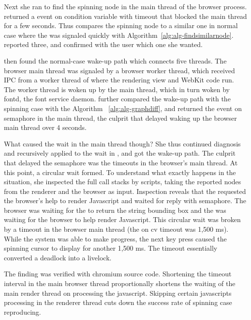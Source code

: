Next she ran \xxx to find the spinning node in the main thread of the browser
process. \xxx returned a  event on condition variable with timeout that
blocked the main thread for a few seconds. Thus \xxx compares the spinning node
to a similar one in normal case where the  was signaled quickly with
Algorithm~\ref{alg:alg-findsimilarnode}. \xxx reported three, and confirmed with
the user which one she wanted.

\xxx then found the normal-case wake-up path which connects five threads. The
browser main thread was signaled by a browser worker thread, which received IPC
from a worker thread of  where the rendering view and WebKit code
run. The worker thread is woken up by the  main thread, which in
turn woken by fontd, the font service daemon. \xxx further compared the wake-up
path with the spinning case with the Algorithm ~\ref{alg:alg-graphdiff}, and
returned the  event on semaphore in the  main thread, the
culprit that delayed waking up the browser main thread over 4 seconds.

What caused the wait in the  main thread though? She thus continued
diagnosis and recursively applied \xxx to the wait in , and got
the wake-up path. The culprit that delayed the semaphore was the timeouts in
the browser's main thread. At this point, a circular wait formed. To understand
what exactly happens in the situation, she inspected the full call stacks by
\xxx scripts, taking the reported nodes from the renderer and the browser as
input. Inspection reveals that the  requested the browser's help to
render Javascript and waited for reply with semaphore. The browser was waiting
for the  to return the string bounding box and the 
was waiting for the browser to help render Javascript. This circular wait was
broken by a timeout in the browser main thread (the  on cv timeout was
1,500 ms). While the system was able to make progress, the next key press caused
the spinning cursor to display for another 1,500 ms. The timeout essentially
converted a deadlock into a livelock.

The finding was verified with chromium source code. Shortening the timeout interval
in the main browser thread proportionally shortens the waiting of the main
render thread on processing the javascript. Skipping certain javascripts
processing in the renderer thread cuts down the success rate of spinning case
reproducing.


